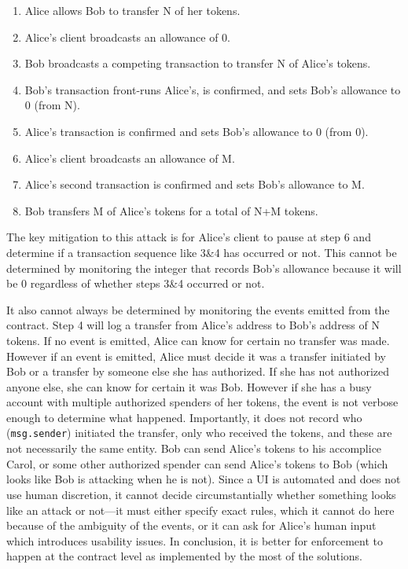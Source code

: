 \begin{enumerate}
	\item Alice allows Bob to transfer N of her tokens.
	\item Alice's client broadcasts an allowance of 0.
	\item Bob broadcasts a competing transaction to transfer N of Alice’s tokens.
	\item Bob's transaction front-runs Alice's, is confirmed, and sets Bob’s allowance to 0 (from N).
	\item Alice’s transaction is confirmed and sets Bob’s allowance to 0 (from 0).
	\item Alice's client broadcasts an allowance of M.
	\item Alice’s second transaction is confirmed and sets Bob's allowance to M.
	\item Bob transfers M of Alice’s tokens for a total of N+M tokens.
\end{enumerate}

The key mitigation to this attack is for Alice's client to pause at step 6 and determine if a transaction sequence like 3\&4 has occurred or not. This cannot be determined by monitoring the integer that records Bob's allowance because it will be 0 regardless of whether steps 3\&4 occurred or not.

It also cannot always be determined by monitoring the events emitted from the contract. Step 4 will log a transfer from Alice's address to Bob's address of N tokens. If no event is emitted, Alice can know for certain no transfer was made. However if an event is emitted, Alice must decide it was a transfer initiated by Bob or a transfer by someone else she has authorized. If she has not authorized anyone else, she can know for certain it was Bob. However if she has a busy account with multiple authorized spenders of her tokens, the event is not verbose enough to determine what happened. Importantly, it does not record who (\texttt{msg.sender}) initiated the transfer, only who received the tokens, and these are not necessarily the same entity. Bob can send Alice's tokens to his accomplice Carol, or some other authorized spender can send Alice's tokens to Bob (which looks like Bob is attacking when he is not). Since a UI is automated and does not use human discretion, it cannot decide circumstantially whether something looks like an attack or not---it must either specify exact rules, which it cannot do here because of the ambiguity of the events, or it can ask for Alice's human input which introduces usability issues. In conclusion, it is better for enforcement to happen at the contract level as implemented by the most of the solutions.

